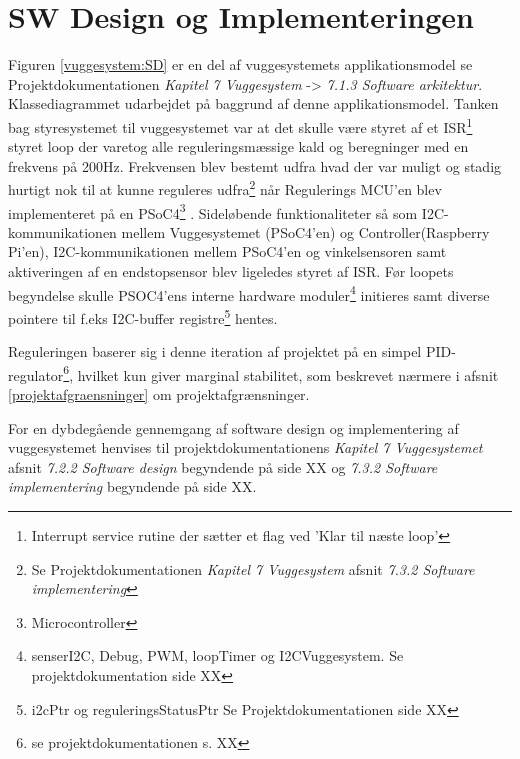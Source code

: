 \section{SW Design og Implementeringen}
\label{vs_sw}
Figuren \ref{vuggesystem:SD} er en del af vuggesystemets applikationsmodel se Projektdokumentationen \textit{Kapitel 7 Vuggesystem} -> \textit{7.1.3 Software arkitektur}. Klassediagrammet udarbejdet på baggrund af denne applikationsmodel.
Tanken bag styresystemet til vuggesystemet var at det skulle være styret af et ISR\footnote{Interrupt service rutine der sætter et flag ved 'Klar til næste loop'} styret loop der varetog alle reguleringsmæssige kald og beregninger med en frekvens på 200Hz. Frekvensen blev bestemt udfra hvad der var muligt og stadig hurtigt nok til at kunne reguleres udfra\footnote{Se Projektdokumentationen \textit{Kapitel 7 Vuggesystem} afsnit \textit{7.3.2 Software implementering}} når Regulerings MCU'en blev implementeret på en PSoC4\footnote{Microcontroller} \citep{website:Cypress}. Sideløbende funktionaliteter så som I2C-kommunikationen mellem Vuggesystemet (PSoC4'en) og Controller(Raspberry Pi'en), I2C-kommunikationen mellem PSoC4'en og vinkelsensoren samt aktiveringen af en endstopsensor blev ligeledes styret af ISR. Før loopets begyndelse skulle PSOC4'ens interne hardware moduler\footnote{senserI2C, Debug, PWM, loopTimer og I2CVuggesystem. Se projektdokumentation side XX} initieres samt diverse pointere til f.eks I2C-buffer registre\footnote{i2cPtr og reguleringsStatusPtr Se Projektdokumentationen side XX} hentes.

Reguleringen baserer sig i denne iteration af projektet på en simpel PID-regulator\footnote{ se projektdokumentationen s. XX}, hvilket kun giver marginal stabilitet, som beskrevet nærmere i afsnit \vref{projektafgraensninger} om projektafgrænsninger.

For en dybdegående gennemgang af software design og implementering af vuggesystemet henvises til projektdokumentationens \textit{Kapitel 7 Vuggesystemet} afsnit \textit{7.2.2 Software design} begyndende på side XX og \textit{7.3.2 Software implementering} begyndende på side XX.

